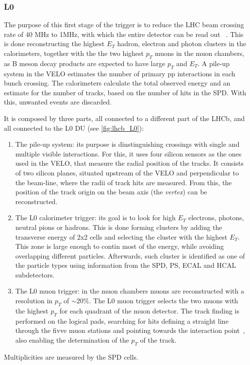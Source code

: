 \subsubsection{L0}
The purpose of this first stage of the trigger is to reduce the LHC beam crossing rate of 40 MHz to 1MHz, with which the entire detector can be read out ~\cite{Alves:2008zz}. This is done reconstructing the highest $E_T$ hadron, electron and photon clusters in the calorimeters, together with the the two highest $p_T$ muons in the muon chambers, as B meson decay products are expected to have large $p_T$ and $E_T$. A pile-up system in the VELO estimates the number of primary pp interactions in each bunch crossing. The calorimeters calculate the total observed energy and an estimate for the number of tracks, based on the number of hits in the SPD. With this, unwanted events are discarded. 

It is composed by three parts, all connected to a different part of the LHCb, and all connected to the L0 DU (see \ref{fig:lhcb_L0}):

\begin{enumerate}
\item The pile-up system: its purpose is dinstinguishing crossings with single and multiple visible interactions. For this, it uses four silicon sensors as the ones used in the VELO, that measure the radial position of the tracks.  It consists of two silicon planes, situated upstream of the VELO and perpendicular to the beam-line, where the radii of track hits are measured.  From this, the position of the track origin on the beam axis (the \textit{vertex}) can be reconstructed.  %
\item The L0 calorimeter trigger: its goal is to look for high $E_T$ electrons, photons, neutral pions or hadrons. This is done forming clusters by adding the transverse energy of 2x2 cells and selecting the cluster with the highest $E_T$. This zone is large enough to contin most of the energy, while avoiding overlapping  different particles. Afterwards, such cluster is identified as one of the particle types using information from the SPD, PS, ECAL and HCAL subdetectors. 
\item The L0 muon trigger: in the muon chambers muons are reconstructed with a resolution in $p_T$ of $\sim 20\%$. The L0 muon trigger selects the two muons with the highest $p_T$ for each quadrant of the muon detector. The track finding is performed on the logical pads, searching for hits defining a straight line through the fivve muon stations and pointing towards the interaction point~\cite{Alves:2008zz}, also enabling the determination of the $p_T$ of the track.  %
\end{enumerate}
Multiplicities are measured by the SPD cells.

